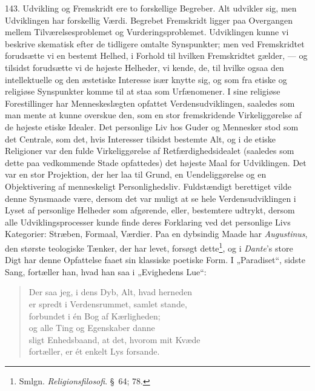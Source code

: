 \documentclass[12pt,a4paper]{book}
\begin{document}
143. Udvikling og Fremskridt ere to forskellige Begreber. Alt udvikler sig, men Udviklingen
har forskellig Værdi. Begrebet Fremskridt ligger paa Overgangen mellem Tilværelsesproblemet
og Vurderingsproblemet. Udviklingen kunne vi beskrive skematisk efter de tidligere omtalte
Synspunkter; men ved Fremskridtet forudsætte vi en bestemt Helhed, i Forhold til hvilken
Fremskridtet gælder, --- og tilsidst forudsætte vi de højeste Helheder, vi kende, de, til
hvilke ogsaa den intellektuelle og den æstetiske Interesse især knytte sig, og som fra
etiske og religiøse Synspunkter komme til at staa som Urfænomener. I sine religiøse
Forestillinger har Menneskeslægten opfattet Verdensudviklingen, saaledes som man mente at
kunne overskue den, som en stor fremskridende Virkeliggørelse af de højeste etiske Idealer.
Det personlige Liv hos Guder og Mennesker stod som det Centrale, som det, hvis Interesser
tilsidst bestemte Alt, og i de etiske Religioner var den fulde Virkeliggørelse af
Retfærdighedsidealet (saaledes som dette paa vedkommende Stade opfattedes) det højeste Maal
for Udviklingen. Det var en stor Projektion, der her laa til Grund, en Uendeliggørelse og
en Objektivering af menneskeligt Personlighedsliv. Fuldstændigt berettiget vilde denne
Synsmaade være, dersom det var muligt at se hele Verdensudviklingen i Lyset af personlige
Helheder som afgørende, eller, bestemtere udtrykt, dersom alle Udviklingsprocesser kunde
finde deres Forklaring ved det personlige Livs Kategorier: Stræben, Formaal, Værdier. Paa
en dybsindig Maade har \emph{Augustinus}, den største teologiske Tænker, der har levet,
forsøgt dette\footnote{Smlgn. \emph{Religionsfilosofi}. \S\ 64; 78.}, og i \emph{Dante}'s
store Digt har denne Opfattelse faaet sin klassiske poetiske Form. I „Paradiset“, sidste
Sang, fortæller han, hvad han saa i „Evighedens Lue“:

\begin{quote}
Der saa jeg, i dens Dyb, Alt, hvad herneden\\
er spredt i Verdensrummet, samlet stande,\\
forbundet i én Bog af Kærligheden;\\
og alle Ting og Egenskaber danne\\
sligt Enhedsbaand, at det, hvorom mit Kvæde\\
fortæller, er ét enkelt Lys forsande.
\end{quote}
\end{document}
